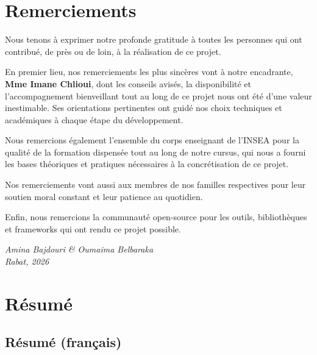 \documentclass[12pt,a4paper]{report}
\begin{document}
\chapter*{Remerciements}
\thispagestyle{fancy}

Nous tenons à exprimer notre profonde gratitude à toutes les personnes
qui ont contribué, de près ou de loin, à la réalisation de ce projet.

En premier lieu, nos remerciements les plus sincères vont à notre
encadrante, \textbf{Mme Imane Chlioui}, dont les conseils avisés, la
disponibilité et l'accompagnement bienveillant tout au long de ce projet
nous ont été d'une valeur inestimable. Ses orientations pertinentes ont
guidé nos choix techniques et académiques à chaque étape du développement.

Nous remercions également l'ensemble du corps enseignant de l'INSEA pour
la qualité de la formation dispensée tout au long de notre cursus, qui nous
a fourni les bases théoriques et pratiques nécessaires à la concrétisation
de ce projet.

Nos remerciements vont aussi aux membres de nos familles respectives pour
leur soutien moral constant et leur patience au quotidien.

Enfin, nous remercions la communauté open-source pour les outils, bibliothèques
et frameworks qui ont rendu ce projet possible.

\vspace{2cm}
\begin{flushright}
\textit{Amina Bajdouri \& Oumaima Belbaraka}\\
\textit{Rabat, 2026}
\end{flushright}

\chapter*{Résumé}
\thispagestyle{fancy}

\section*{Résumé (français)}
\end{document}
